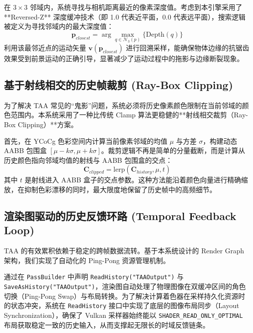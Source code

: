 在 $3 \times 3$ 邻域内，系统寻找与相机距离最近的像素深度值。考虑到本引擎采用了 **Reversed-Z** 深度缓冲技术（即 1.0 代表近平面，0.0 代表远平面），搜索逻辑被定义为寻找邻域内的最大深度值：
\begin{equation}
    \mathbf{p}_{closest} = \arg\max_{q \in \mathcal{N}_3(p)} \{ \text{Depth}(q) \}
\end{equation}
利用该最邻近点的运动矢量 $\mathbf{v}(\mathbf{p}_{closest})$ 进行回溯采样，能确保物体边缘的抗锯齿效果受到前景运动的正确引导，显著减少了运动过程中的拖影与边缘断裂现象。

\subsection{基于射线相交的历史帧裁剪 (Ray-Box Clipping)}
为了解决 TAA 常见的“鬼影”问题，系统必须将历史像素颜色限制在当前邻域的颜色范围内。本系统采用了一种比传统 Clamp 算法更稳健的**射线相交裁剪（Ray-Box Clipping）**方案。

首先，在 YCoCg 色彩空间内计算当前像素邻域的均值 $\mu$ 与方差 $\sigma$，构建动态 AABB 包围盒 $[\mu - k\sigma, \mu + k\sigma]$。裁剪逻辑不再是简单的分量截断，而是计算从历史颜色指向邻域均值的射线与 AABB 包围盒的交点：
\begin{equation}
    \mathbf{C}_{clipped} = \text{lerp}(\mathbf{C}_{history}, \mu, t)
\end{equation}
其中 $t$ 是射线进入 AABB 盒子的交点参数。这种方法能沿着颜色向量进行精确缩放，在抑制色彩漂移的同时，最大限度地保留了历史帧中的高频细节。

\subsection{渲染图驱动的历史反馈环路 (Temporal Feedback Loop)}
TAA 的有效累积依赖于稳定的跨帧数据流转。基于本系统设计的 Render Graph 架构，我们实现了自动化的 Ping-Pong 资源管理机制。

通过在 \texttt{PassBuilder} 中声明 \texttt{ReadHistory("TAAOutput")} 与 \texttt{SaveAsHistory("TAAOutput")}，渲染图自动处理了物理图像在双缓冲区间的角色切换（Ping-Pong Swap）与布局转换。为了解决计算着色器在采样持久化资源时的状态冲突，系统在 \texttt{ReadHistory} 接口中实现了底层的图像布局同步（Layout Synchronization），确保了 Vulkan 采样器始终能以 \texttt{SHADER\_READ\_ONLY\_OPTIMAL} 布局获取稳定一致的历史输入，从而支撑起无限长的时域反馈链条。

